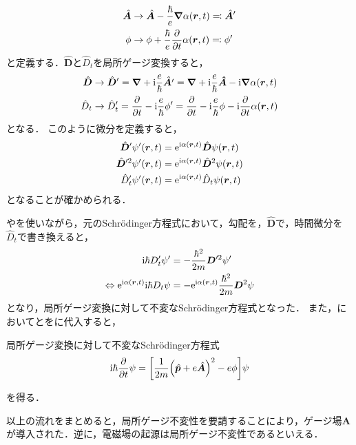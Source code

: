 \documentclass{report}
\begin{document}
  \begin{align}
    \hat{\bm{A}} &\to \hat{\bm{A}} - \frac{\hbar}{e}\grad\alpha(\bm{r}, t) \eqqcolon \hat{\bm{A}}' \\ 
    \phi &\to \phi + \frac{\hbar}{e}\pdv{t}\alpha(\bm{r}, t) \eqqcolon \phi'  
  \end{align}
  と定義する．$\hat{\bm{D}}$と$\hat{D}_t$を局所ゲージ変換すると，
  \begin{align}
    \hat{\bm{D}} &\to \hat{\bm{D}}' = \grad + \mathrm{i}\frac{e}{\hbar}\hat{\bm{A}'} = \grad + \mathrm{i}\frac{e}{\hbar}\bm{\hat{A}} - \mathrm{i}\grad\alpha(\bm{r}, t) \\ 
    \hat{D}_t &\to \hat{D}_t' = \pdv{t} - \mathrm{i}\frac{e}{\hbar}\phi' = \pdv{t} - \mathrm{i}\frac{e}{\hbar}\phi - \mathrm{i}\pdv{t}\alpha(\bm{r}, t)
  \end{align}
  となる．
  このように微分を定義すると，
  \begin{align}
    \hat{\bm{D}}'\psi'(\bm{r}, t) &= \mathrm{e}^{\mathrm{i}\alpha(\bm{r}, t)}\hat{\bm{D}}\psi(\bm{r}, t) \label{d-prime}\\ 
    \hat{\bm{D}}'^2\psi'(\bm{r}, t) &= \mathrm{e}^{\mathrm{i}\alpha(\bm{r}, t)}\hat{\bm{D}}^2\psi(\bm{r}, t) \label{d-prime-power}\\ 
    \hat{D}_t'\psi'(\bm{r}, t) &= \mathrm{e}^{\mathrm{i}\alpha(\bm{r}, t)}\hat{D}_t\psi(\bm{r}, t) \label{dt-prime}
  \end{align}
  となることが確かめられる．
  \par
  やを使いながら，元のSchr\"odinger方程式において，勾配を，$\hat{\bm{D}}$で，時間微分を$\hat{D}_t$で書き換えると，
  \begin{align}
    \mathrm{i}\hbar D'_t\psi' &= -\frac{\hbar^2}{2m}\bm{D}'^2\psi' \\
    \Leftrightarrow \mathrm{e}^{\mathrm{i}\alpha(\bm{r}, t)}\mathrm{i}\hbar D_t\psi &= -\mathrm{e}^{\mathrm{i}\alpha(\bm{r}, t)}\frac{\hbar^2}{2m}\bm{D}^2\psi\label{local-gauge-psi}
  \end{align}
  となり，局所ゲージ変換に対して不変なSchrödinger方程式となった．
  また，においてとをに代入すると，
  \begin{itembox}[l]{局所ゲージ変換に対して不変なSchrödinger方程式}
    \begin{align}
      \mathrm{i}\hbar\pdv{t}\psi = \qty[\frac{1}{2m}\qty(\hat{\bm{p}} + e\hat{\bm{A}})^2 - e\phi]\psi
    \end{align}
  \end{itembox}
  を得る．
  \par
  以上の流れをまとめると，局所ゲージ不変性を要請することにより，ゲージ場$\bm{A}$が導入された．逆に，電磁場の起源は局所ゲージ不変性であるといえる．
\end{document}
